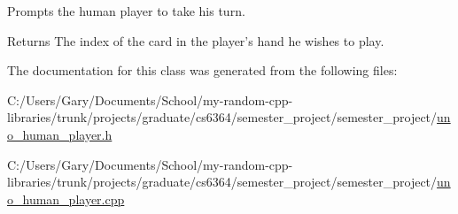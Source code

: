 \-Prompts the human player to take his turn. 

\begin{DoxyReturn}{\-Returns}
\-The index of the card in the player's hand he wishes to play. 
\end{DoxyReturn}


\-The documentation for this class was generated from the following files\-:\begin{DoxyCompactItemize}
\item 
\-C\-:/\-Users/\-Gary/\-Documents/\-School/my-\/random-\/cpp-\/libraries/trunk/projects/graduate/cs6364/semester\-\_\-project/semester\-\_\-project/\hyperlink{uno__human__player_8h}{uno\-\_\-human\-\_\-player.\-h}\item 
\-C\-:/\-Users/\-Gary/\-Documents/\-School/my-\/random-\/cpp-\/libraries/trunk/projects/graduate/cs6364/semester\-\_\-project/semester\-\_\-project/\hyperlink{uno__human__player_8cpp}{uno\-\_\-human\-\_\-player.\-cpp}\end{DoxyCompactItemize}
